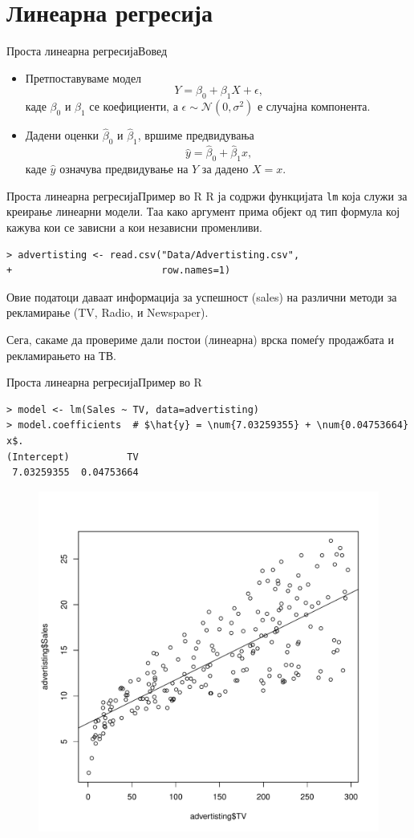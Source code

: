 \documentclass[hyperref={unicode}, xcolor={svgnames, table},
usepdftitle=false]{beamer}
\theoremstyle{remark}
\begin{document}
\section{Линеарна регресија}

\begin{frame}{Проста линеарна регресија}{Вовед}
  \begin{itemize}
  \item Претпоставуваме модел
    \[
      Y = \beta_0 + \beta_1 X + \epsilon\text{,}
    \]
    каде \(\beta_0\) и \(\beta_1\) се коефициенти, а
    \(\epsilon \sim \mathcal{N}(0, \sigma^2)\) е случајна компонента.
  \item Дадени оценки \(\hat{\beta}_0\) и \(\hat{\beta}_1\), вршиме предвидувања
    \[
      \hat{y} = \hat{\beta}_0 + \hat{\beta}_1 x\text{,}
    \]
    каде \(\hat{y}\) означува предвидување на \(Y\) за дадено \(X = x\).
  \end{itemize}
\end{frame}

\begin{frame}[fragile]{Проста линеарна регресија}{Пример во R}
  R ја содржи функцијата \texttt{lm} која служи за креирање линеарни
  модели.  Таа како аргумент прима објект од тип формула кој кажува кои се
  зависни а кои независни променливи.
\begin{verbatim}
> advertisting <- read.csv("Data/Advertisting.csv",
+                          row.names=1)
\end{verbatim}
  Овие податоци даваат информација за успешност (sales) на различни методи за
  рекламирање (TV, Radio, и Newspaper).

  Сега, сакаме да провериме дали постои (линеарна) врска помеѓу продажбата и
  рекламирањето на ТВ.
\end{frame}

\begin{frame}[fragile]{Проста линеарна регресија}{Пример во R}
\begin{verbatim}
> model <- lm(Sales ~ TV, data=advertisting)
> model.coefficients  # $\hat{y} = \num{7.03259355} + \num{0.04753664} x$.
(Intercept)          TV
 7.03259355  0.04753664
\end{verbatim}
  \begin{figure}
    \centering
    \includegraphics[width=.45\textwidth]{Plot_Simple_Regression.pdf}
  \end{figure}
\end{frame}
\end{document}
